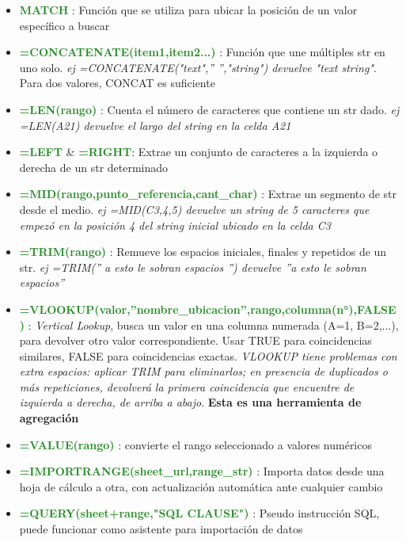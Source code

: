 \begin{itemize}
    \item {\textcolor{ForestGreen}{\textbf{MATCH}} : Función que se utiliza para ubicar la posición de un valor específico a buscar}
    \item {\textcolor{ForestGreen}{\textbf{=CONCATENATE(item1,item2...)}} : Función que une múltiples \gls{str} en uno solo. \textit{ej =CONCATENATE("text",'' '',"string") devuelve "text string"}. Para dos valores, CONCAT es suficiente}
    \item {\textcolor{ForestGreen}{\textbf{=LEN(rango)}} : Cuenta el número de caracteres que contiene un \gls{str} dado. \textit{ej =LEN(A21) devuelve el largo del string en la celda A21}}
    \item {\textcolor{ForestGreen}{\textbf{=LEFT}} \& \textcolor{ForestGreen}{\textbf{=RIGHT}}: Extrae un conjunto de caracteres a la izquierda o derecha de un \gls{str} determinado}
    \item {\textcolor{ForestGreen}{\textbf{=MID(rango,punto\_referencia,cant\_char)}} : Extrae un segmento de \gls{str} desde el medio. \textit{ej =MID(C3,4,5) devuelve un string de 5 caracteres que empezó en la posición 4 del string inicial ubicado en la celda C3}}
    \item {\textcolor{ForestGreen}{\textbf{=TRIM(rango)}} : Remueve los espacios iniciales, finales y repetidos de un \gls{str}. \textit{ej =TRIM('' a esto le sobran espacios  '') devuelve ''a esto le sobran espacios''}}
    \item {\textcolor{ForestGreen}{\textbf{=VLOOKUP(valor,''nombre\_ubicacion'',rango,columna(n°),FALSE)}} : \textit{Vertical Lookup}, busca un valor en una columna numerada (A=1, B=2,...), para devolver otro valor correspondiente. Usar TRUE para coincidencias similares, FALSE para coincidencias exactas. \textit{VLOOKUP tiene problemas con extra espacios: aplicar TRIM para eliminarlos; en presencia de duplicados o más repeticiones, devolverá la primera coincidencia que encuentre de izquierda a derecha, de arriba a abajo}. \textbf{Esta es una herramienta de agregación}}
    \item {\textcolor{ForestGreen}{\textbf{=VALUE(rango)}} : convierte el rango seleccionado a valores numéricos}
    \item {\textcolor{ForestGreen}{\textbf{=IMPORTRANGE(sheet\_url,range\_str)}} : Importa datos desde una hoja de cálculo a otra, con actualización automática ante cualquier cambio}
    \item {\textcolor{ForestGreen}{\textbf{=QUERY(sheet+range,"SQL CLAUSE")}} : Pseudo instrucción SQL, puede funcionar como asistente para importación de datos}

\end{itemize}

